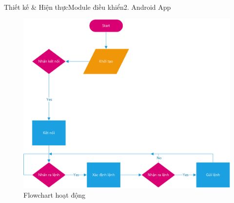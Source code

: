 \documentclass[compress, blue, 13pt,hyperref={pdfpagemode=FullScreen}]{beamer}
\begin{document}
\begin{frame}{Thiết kế \& Hiện thực}{Module điều khiển}{2. Android App}
\begin{figure}[hbtp]
\centering
\includegraphics[scale=0.45]{images/flowchart_app.png}
\caption{Flowchart hoạt động}
\end{figure}
\end{frame}
\end{document}

